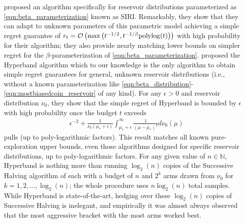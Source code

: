 \citet{DBLP:journals/corr/CarpentierV15} proposed an algorithm specifically for  reservoir distributions parameterized as \eqref{eqn:beta_parameterization} known as SIRI.
Remarkably, they show that they can adapt to unknown parameters of this parametric model achieving a simple regret guarantee of  $r_t=\mathcal{O}\left( \max\left(t^{-1/2}, t^{-1/\beta}{\rm polylog}(t)\right)\right)$ with high probability for their algorithm; they also provide nearly matching lower bounds on simpler regret for the $\beta$-parameterization of \eqref{eqn:beta_parameterization}.
\citet{li2017hyperband} proposed the Hyperband algorithm which to our knowledge is the only algorithm to obtain simple regret guarantees for general, unknown reservoir distributions (i.e., without a known parameterization like \eqref{eqn:beta_distribution}-\eqref{eqn:mostbiasedcoin_reservoir} of any kind).
For any $\epsilon>0$ and reservoir distribution $\nu_0$, they show that the simple regret of Hyperband is bounded by $\epsilon$ with high probability once the budget $t$ exceeds 
\begin{align}\label{eqn:rough_sample_complexity}
\epsilon^{-2} + \tfrac{1}{\nu_0(\mu_* + \epsilon)}\int_{\mu_*+\epsilon}^\infty \tfrac{1}{(\mu-\mu_*)^2} d\nu_0(\mu)
\end{align}
pulls (up to poly-logarithmic factors).
This result matches all known pure-exploration upper bounds, even those algorithms designed for specific reservoir distributions, up to poly-logarithmic factors.
For any given value of $n \in \mathbb{N}$, Hyperband is nothing more than running $\log_2(n)$ copies of the Successive Halving algorithm of \cite{icml2013_karnin13} each with a budget of $n$ and $2^k$ arms drawn from $\nu_0$ for $k=1,2,\dots,\log_2(n)$; the whole procedure uses $n \log_2(n)$ total samples. 
While Hyperband is state-of-the-art, hedging over these $\log_2(n)$ copies of Successive Halving is inelegant, and empirically it was almost always observed that the most aggressive bracket with the most arms worked best. 


